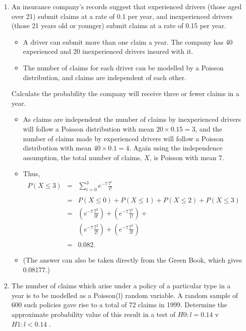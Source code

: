 \documentclass[a4paper,12pt]{article}
\begin{document}
\begin{enumerate}
\item  An insurance company’s records suggest that experienced drivers (those aged
over 21) submit claims at a rate of 0.1 per year, and inexperienced drivers (those 21 years old or younger) submit claims at a rate of 0.15 per year. 
\begin{itemize}
\item A driver can submit more than one claim a year. The company has 40 experienced and 20 inexperienced drivers insured with it.
\item The number of claims for each driver can be modelled by a Poisson distribution, and claims are independent of each other.
\end{itemize}
 Calculate the
probability the company will receive three or fewer claims in a year. 

\newpage
\begin{itemize}
\item  As claims are independent the number of claims by inexperienced drivers will
follow a Poisson distribution with mean $20 \times 0.15 = 3$, and the number of claims
made by experienced drivers will follow a Poisson distribution with mean
$40 \times 0.1 = 4$. Again using the independence assumption, the total number of
claims, $X$, is Poisson with mean 7.
\item Thus, 
\begin{eqnarray*}
P(X \leq 3) &=& \sum^{3}_{i=0} e^{-7} \frac{7^i}{i!}\\
& & \\
&=& P(X \leq 0) + P(X \leq 1) + P(X \leq 2) + P(X \leq 3)\\
&=& \left(e^{-7} \frac{7^0}{0!} \right) + \left(e^{-7} \frac{7^1}{1!}\right) + \\
& & \left(e^{-7} \frac{7^2}{2!}\right) + \left(e^{-7} \frac{7^3}{3!}\right)\\
& & \\
&=& 0.082.
\end{eqnarray*}
\item (The answer can also be taken directly from the Green Book, which gives
0.08177.)
\end{itemize}

\newpage

\item The number of claims which arise under a policy of a particular type in a year
is to be modelled as a Poisson(l) random variable. A random sample of 600
such policies gave rise to a total of 72 claims in 1999.
Determine the approximate probability value of this result in a test of
$H0 : l = 0.14$ v $H1 : l < 0.14$ .
\end{enumerate}
\end{document}
